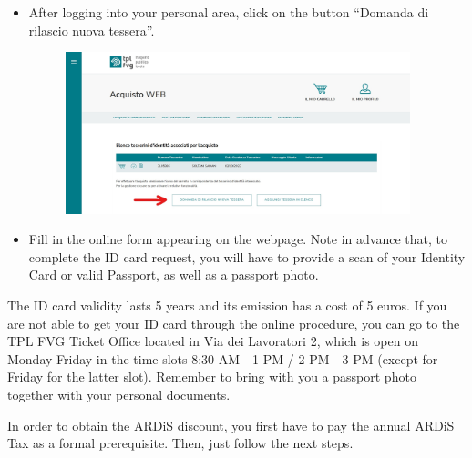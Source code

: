 \documentclass{sissavademecum}
\begin{document}
\begin{itemize}
    \item After logging into your personal area, click on the button ``Domanda di rilascio nuova tessera''.
    \begin{figure}[!htp] 
        \begin{center}
            \includegraphics[width=10cm]{ardis_bus/s3.jpg}
        \end{center}
    \end{figure}
    \item Fill in the online form appearing on the webpage. Note in advance that, to complete the ID card request, you will have to provide a scan of your Identity Card or valid Passport, as well as a passport photo.
\end{itemize}

The ID card validity lasts 5 years and its emission has a cost of 5 euros. If you are not able to get your ID card through the online procedure, you can go to the TPL FVG Ticket Office located in Via dei Lavoratori 2, which is open on Monday-Friday in the time slots 8:30 AM - 1 PM / 2 PM - 3 PM (except for Friday for the latter slot). Remember to bring with you a passport photo together with your personal documents.

In order to obtain the ARDiS discount, you first have to pay the annual ARDiS Tax as a formal prerequisite. Then, just follow the next steps.
\end{document}
